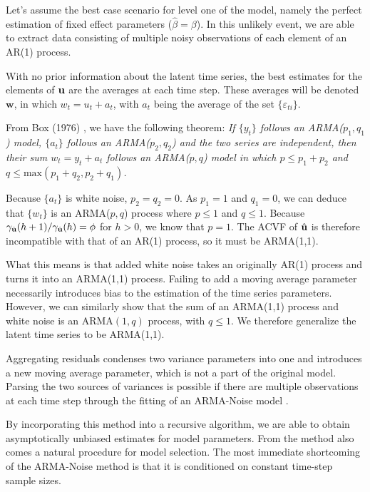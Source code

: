 Let's assume the best case scenario for level one of the model,
 namely the perfect estimation of fixed effect parameters 
 ($\hat{\beta} = \beta$). In this unlikely event, we are able to 
extract data consisting of multiple noisy observations of each element of an AR(1) process.

 With no prior information about the latent time series, the
  best estimates for the elements of $\mathbf{u}$ are the averages at 
  each time step. These averages will be denoted $\mathbf{w}$, in which $w_t = u_t + a_t$, with $a_t$ being
  the average of the set $\{\varepsilon_{ti}\}$. 

   From Box (1976) \citep{box1976time}, we have the following theorem: \textit{If $\{y_t\}$ follows an ARMA($p_1,q_1$) model, $\{a_t\}$ follows an ARMA($p_2,q_2$) and the two series are independent, then their sum $w_t = y_t + a_t$ follows an ARMA($p,q$) model in which $p \leq p_1 + p_2$ and $q \leq \text{max}(p_1 + q_2,p_2 + q_1)$. }

Because $\{a_t\}$ is white noise, $p_2 = q_2 = 0$. As $p_1=1$ and $q_1=0$, we can deduce that $\{w_t\}$ is an ARMA($p,q$) process where $p\leq 1$ and $q \leq 1$. Because $\gamma_{\hat{\mathbf{u}}}(h+1)/\gamma_{\hat{\mathbf{u}}}(h) = \phi $ for $h > 0$, we know that $p = 1$. The ACVF of $\hat{\mathbf{u}}$ is therefore incompatible with that of an AR(1) process, so it must be ARMA(1,1).

  
  What this means is that added white noise takes an originally AR(1) process
  and turns it into an ARMA(1,1) process. Failing to add a moving
  average parameter necessarily introduces bias to the estimation of 
  the time series parameters. However, we can similarly show that the sum of 
  an ARMA(1,1) process and white noise is an ARMA$(1,q)$ process, with $q\leq 1$.
  We therefore generalize the latent time series to be ARMA(1,1).

  Aggregating residuals condenses two variance parameters into one and introduces a new 
  moving average parameter, which is not a part of the original model. Parsing the two sources 
  of variances is possible if there are multiple observations at each time step 
  through the fitting of an ARMA-Noise model \cite{WongMiller1990}. 
  
  By incorporating this method into a recursive algorithm, we are able to obtain asymptotically unbiased
  estimates for model parameters. From the method also comes a natural procedure for model selection. The most immediate 
  shortcoming of the ARMA-Noise method is that it is conditioned on constant time-step sample sizes.


